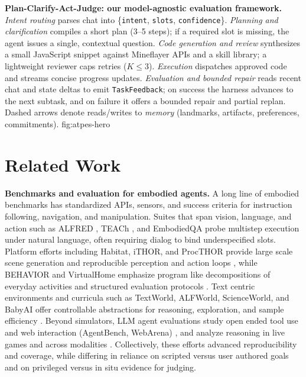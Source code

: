 {\textbf{Plan-Clarify-Act-Judge: our model-agnostic evaluation framework.}
 \emph{Intent routing} parses chat into \{\texttt{intent}, \texttt{slots}, \texttt{confidence}\}.
 \emph{Planning and clarification} compiles a short plan (3–5 steps); if a required slot is missing, the agent issues a single, contextual question.
 \emph{Code generation and review} synthesizes a small JavaScript snippet against Mineflayer APIs and a skill library; a lightweight reviewer caps retries ($K{\le}3$).
 \emph{Execution} dispatches approved code and streams concise progress updates.
 \emph{Evaluation and bounded repair} reads recent chat and state deltas to emit \texttt{TaskFeedback}; on success the harness advances to the next subtask, and on failure it offers a bounded repair and partial replan. Dashed arrows denote reads/writes to \emph{memory} (landmarks, artifacts, preferences, commitments).}
{fig:atpes-hero}

\section{Related Work}

\noindent\textbf{Benchmarks and evaluation for embodied agents.}
A long line of embodied benchmarks has standardized APIs, sensors, and success criteria for instruction following, navigation, and manipulation. Suites that span vision, language, and action such as ALFRED \citep{shridhar2020alfred}, TEACh \cite{teach2021}, and EmbodiedQA \citep{das2018embodiedqa} probe multistep execution under natural language, often requiring dialog to bind underspecified slots. Platform efforts including Habitat, iTHOR, and ProcTHOR provide large scale scene generation and reproducible perception and action loops \citep{savva2019habitat,ithor,procthor2022}, while BEHAVIOR and VirtualHome emphasize program like decompositions of everyday activities and structured evaluation protocols \citep{behavior2021,puig2018virtualhome}. Text centric environments and curricula such as TextWorld, ALFWorld, ScienceWorld, and BabyAI offer controllable abstractions for reasoning, exploration, and sample efficiency \citep{textworld2018,alfworld2021,scienceworld2022,babyai2019}. Beyond simulators, LLM agent evaluations study open ended tool use and web interaction (AgentBench, WebArena) \citep{agentbench2023,webarena2023}, and analyze reasoning in live games and across modalities \citep{hu2024gamearena,momente2025triangulating,yannakakis2018artificial}. Collectively, these efforts advanced reproducibility and coverage, while differing in reliance on scripted versus user authored goals and on privileged versus in situ evidence for judging.

